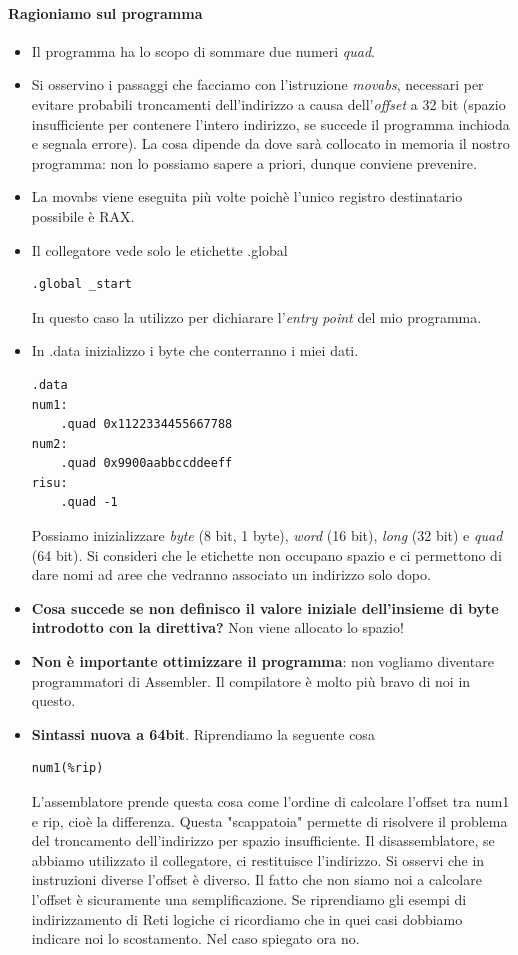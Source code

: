 \documentclass[11pt]{report}
\theoremstyle{definition}
\begin{document}
\paragraph{Ragioniamo sul programma}
\begin{itemize}
\item Il programma ha lo scopo di sommare due numeri \emph{quad}. 
\item Si osservino i passaggi che facciamo con l'istruzione \emph{movabs}, necessari per evitare probabili troncamenti dell'indirizzo a causa dell'\emph{offset} a 32 bit (spazio insufficiente per contenere l'intero indirizzo, se succede il programma inchioda e segnala errore). La cosa dipende da dove sarà collocato in memoria il nostro programma: non lo possiamo sapere a priori, dunque conviene prevenire. 
\item La movabs viene eseguita più volte poichè l'unico registro destinatario possibile è RAX.
\item Il collegatore vede solo le etichette .global 
\begin{verbatim}
.global _start
\end{verbatim}In questo caso la utilizzo per dichiarare l'\emph{entry point} del mio programma.
\item In .data inizializzo i byte che conterranno i miei dati.  
\begin{verbatim}
.data
num1:
    .quad 0x1122334455667788
num2:
    .quad 0x9900aabbccddeeff
risu:
    .quad -1
\end{verbatim}
Possiamo inizializzare \emph{byte} (8 bit, 1 byte), \emph{word} (16 bit), \emph{long} (32 bit) e \emph{quad} (64 bit). Si consideri che le etichette non occupano spazio e ci permettono di dare nomi ad aree che vedranno associato un indirizzo solo dopo. 
\item \textbf{Cosa succede se non definisco il valore iniziale dell'insieme di byte introdotto con la direttiva?} Non viene allocato lo spazio! 
\item \textbf{Non è importante ottimizzare il programma}: non vogliamo diventare programmatori di Assembler. Il compilatore è molto più bravo di noi in questo.

\item \textbf{Sintassi nuova a 64bit}. Riprendiamo la seguente cosa
\begin{verbatim}
num1(%rip)
\end{verbatim}
L'assemblatore prende questa cosa come l'ordine di calcolare l'offset tra num1 e rip, cioè la differenza. Questa "scappatoia" permette di risolvere il problema del troncamento dell'indirizzo per spazio insufficiente. Il disassemblatore, se abbiamo utilizzato il collegatore, ci restituisce l'indirizzo. Si osservi che in instruzioni diverse l'offset è diverso. Il fatto che non siamo noi a calcolare l'offset è sicuramente una semplificazione. Se riprendiamo gli esempi di indirizzamento di Reti logiche ci ricordiamo che in quei casi dobbiamo indicare noi lo scostamento. Nel caso spiegato ora no.


\end{itemize}
\end{document}
